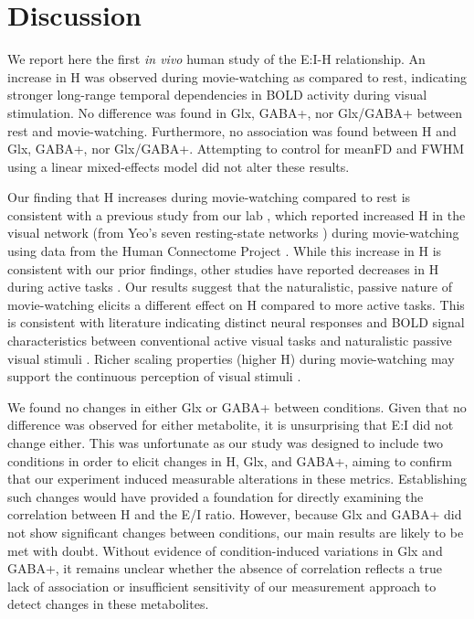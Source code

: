\documentclass[
true
]{sn-jnl}
\begin{document}
\section{Discussion}\label{discussion}

We report here the first \emph{in vivo} human study of the E:I-H
relationship. An increase in H was observed during movie-watching as
compared to rest, indicating stronger long-range temporal dependencies
in BOLD activity during visual stimulation. No difference was found in
Glx, GABA+, nor Glx/GABA+ between rest and movie-watching. Furthermore,
no association was found between H and Glx, GABA+, nor Glx/GABA+.
Attempting to control for meanFD and FWHM using a linear mixed-effects
model did not alter these results.

Our finding that H increases during movie-watching compared to rest is
consistent with a previous study from our lab
\citep{campbellFractalBasedAnalysisFMRI2022}, which reported increased H
in the visual network (from Yeo's seven resting-state networks
\citep{thomasyeoOrganizationHumanCerebral2011}) during movie-watching
using data from the Human Connectome Project
\citep{vanessenHumanConnectomeProject2012}. While this increase in H is
consistent with our prior findings, other studies have reported
decreases in H during active tasks
\citep{heScaleFreePropertiesFunctional2011, churchillSuppressionScalefreeFMRI2016, ciuciuInterplayFunctionalConnectivity2014, barnesEndogenousHumanBrain2009}.
Our results suggest that the naturalistic, passive nature of
movie-watching elicits a different effect on H compared to more active
tasks. This is consistent with literature indicating distinct neural
responses and BOLD signal characteristics between conventional active
visual tasks and naturalistic passive visual stimuli
\citep{campbellFractalBasedAnalysisFMRI2022, hassonReliabilityCorticalActivity2010}.
Richer scaling properties (higher H) during movie-watching may support
the continuous perception of visual stimuli
\citep{campbellFractalBasedAnalysisFMRI2022}.

We found no changes in either Glx or GABA+ between conditions. Given
that no difference was observed for either metabolite, it is
unsurprising that E:I did not change either. This was unfortunate as our
study was designed to include two conditions in order to elicit changes
in H, Glx, and GABA+, aiming to confirm that our experiment induced
measurable alterations in these metrics. Establishing such changes would
have provided a foundation for directly examining the correlation
between H and the E/I ratio. However, because Glx and GABA+ did not show
significant changes between conditions, our main results are likely to
be met with doubt. Without evidence of condition-induced variations in
Glx and GABA+, it remains unclear whether the absence of correlation
reflects a true lack of association or insufficient sensitivity of our
measurement approach to detect changes in these metabolites.
\end{document}
